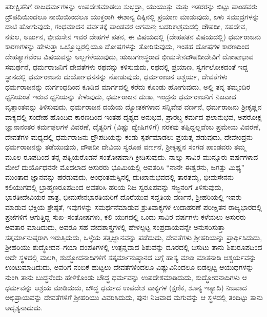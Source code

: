 ಪರೀಕ್ಷಿತನಿಗೆ ರಾಜಧರ್ಮಗಳನ್ನು ಉಪದೇಶಮಾಡಲು ಸುಭದ್ರಾ, ಯುಯುತ್ಸು ಮತ್ತು ಇತರರನ್ನು ಬಿಟ್ಟು ಪಾಂಡವರು ದ್ರೌಪದಿಯಿಂದಲೂ ನಾಯಿಯಿಂದಲೂ ಯುಕ್ತರಾಗಿ ಈಶಾನ್ಯ ದಿಕ್ಕಿನಲ್ಲಿ ಪ್ರಯಾಣ ಮಾಡುವುದು, ಏಳು ಸಮುದ್ರಗಳನ್ನು ದಾಟಿ ಹೋಗುವುದು, ಗಂಧಮಾದನ ಪರ್ವತಕ್ಕೆ ಪಾಂಡವರ ಆಗಮನ; ಬದರಿಕಾಶ್ರಮದಲ್ಲಿ ದೌಪದೀ, ಸಹದೇವ, ನಕುಲ, ಅರ್ಜುನ, ಭೀಮಸೇನ ಇವರ ದೇಹಗಳ ಪತನ, ಈ ವಿಷಯದಲ್ಲಿ (ದೇಹಪತನ ವಿಷಯದಲ್ಲಿ) ಧರ್ಮರಾಜನು ಕಾರಣಗಳನ್ನು ಹೇಳುತ್ತಾ ಒಬ್ಬೊಬ್ಬರಲ್ಲಿಯೂ ದೋಷಗಳನ್ನು ತೋರಿಸುವುದು, ಇಂತಹ ದೋಷಗಳ ಕಾರಣದಿಂದ ದೇಹತ್ಯಾಗವೆಂಬ ವಿಷಯವನ್ನು ಅಲ್ಲಗಳೆಯುವುದು, ಋಜುಗಣಸ್ಥರಾದ ಭೀಮಸೇನದೌಪದೀದೇವಿಗೆ ದೋಷಾಭಾವ ಸಮರ್ಥನೆ, ಧರ್ಮರಾಜನಿಗೆ ದೇವತೆಗಳು ರಥವನ್ನು ಕಳಿಸುವುದು, ರಥದಲ್ಲಿ ಪ್ರಯಾಣ, ಸ್ವರ್ಗಲೋಕದಂತೆ ಇದ್ದ ಸ್ಥಾನದಲ್ಲಿ ಧರ್ಮರಾಜನು ದುರ್ಯೋಧನನನ್ನು ನೋಡುವುದು, ಧರ್ಮರಾಜನ ಆಶ್ಚರ್ಯ, ದೇವತೆಗಳು ಧರ್ಮರಾಜನನ್ನು ದುರ್ಗಂಧದಿಂದ ಕೂಡಿದ ಮಾರ್ಗದಲ್ಲಿ ಕರೆದು ಕೊಂಡು ಹೋಗುವುದು, ಅಲ್ಲಿ ತನ್ನ ತಮ್ಮಂದಿರ ಧ್ವನಿಯಂತೆ ಇರುವ ಧ್ವನಿಯನ್ನು ಕೇಳುವುದು, ಧರ್ಮರಾಜನ ದುಃಖ, ಇಂದ್ರನು ಧರ್ಮರಾಜನಿಗೆ ನಿಜವಾದ ವೃತ್ತಾಂತವನ್ನು ತಿಳಿಸುವುದು, ಧರ್ಮರಾಜನ ದಯೆಯ ದ್ಯೋತಕಗಳಾದ ಸನ್ನಿವೇಶ ವರ್ಣನೆ, ಧರ್ಮರಾಜನು ಶ‍್ರೀಕೃಷ್ಣನ ವಾಕ್ಯದಲ್ಲಿ ಸಂದೇಹ ಹೊಂದಿದ ಕಾರಣದಿಂದ ಇಂತಹ ದೃಶ್ಯದ ಅನುಭವ, ಪ್ರಾರಬ್ಧ ಕರ್ಮದ ಫಲಾನುಭವ, ಅಪರೋಕ್ಷ ಜ್ಞಾನಾನಂತರ ಕರ್ಮಫಲಗಳ ವಿವರಣೆ, ದೈತ್ಯರಿಗೆ (ವಿಷ್ಣು ದ್ವೇಷಿಗಳಿಗೆ) ನರಕವು ತಪ್ಪಿದ್ದಲ್ಲವೆಂಬ ಪ್ರಮೇಯ ವಿವರಣೆ, ದೇವತೆಗಳ ಮಧ್ಯದಲ್ಲಿ ಧರ್ಮರಾಜನು ದ್ರೌಪದಿಯನ್ನು ಕಂಡು ಸ್ಪರ್ಶಮಾಡಲು ಪ್ರಯತ್ನ ಪಡುವುದು, ದೇವೇಂದ್ರನು ಧರ್ಮರಾಜನನ್ನು ತಡೆಯುವುದು, ದೌಪದೀ ದೇವಿಯ ಸ್ವರೂಪ ವರ್ಣನೆ, ಶ‍್ರೀಕೃಷ್ಣನ ಸಂಗಡ ಪಾಂಡವರು ತಮ್ಮ ಮೂಲ ರೂಪದಿಂದ ತನ್ನ ಪತ್ನಿಯರೊಡನೆ ಸಂತೋಷವಾಗಿ ಕ್ರೀಡಿಸುವುದು. ನಾಲ್ಕು ಸಾವಿರ ಮುನ್ನೂರು ವರ್ಷಗಳಾದ ಮೇಲೆ ದುರ್ಯೊಧನನೇ ಮೊದಲಾದ ಅಸುರರು ಭೂಮಿಯಲ್ಲಿ ಅವತರಿಸಿ “ನಾನೇ ಈಶ್ವರನು, ಜಗತ್ತು ಮಿಥ್ಯ” ಮುಂತಾದ ಜ್ಞಾನವನ್ನು ಹರಡುವುದು, ಅಂಧಂತಮಸ್ಸಿನಲ್ಲಿ ದುಃಖಾನುಭವದಲ್ಲಿ ತಾರತಮ್ಯ, ಭೀಮಸೇನನು ಕಲಿಯುಗದಲ್ಲಿ ಬ್ರಾಹ್ಮಣರೂಪದಿಂದ ಅವತರಿಸಿ ಹರಿಯ ನಿಜ ಸ್ವರೂಪವನ್ನು ಸಜ್ಜನರಿಗೆ ತಿಳಿಸುವುದು, ಭಾರತೀದೇವಿಯರ ಪಾತ್ರ, ಭೀಮಸೇನಭಾರತಿಯರಿಗೆ ದೊರೆಯುವ ಸದ್ದತಿಯ ವರ್ಣನೆ, ಶ‍್ರೀಹರಿಯಲ್ಲಿ ಇವರು ಮಾಡುವ ಭಕ್ತಿಯ ಶ್ರೇಷ್ಠತೆ, ಇವುಗಳನ್ನು ಸಮರ್ಥನೆಮಾಡುವ ಶ್ರುತಿವಾಕ್ಯಗಳ ಉದಾಹರಣೆ ಪರೀಕ್ಷಿತನ ರಾಜ್ಯಭಾರದಲ್ಲಿ ಪ್ರಜೆಗಳಿಗೆ ಆಗುತ್ತಿದ್ದ ಸುಖ–ಸಂತೋಷಗಳು, ಕಲಿ ಯುಗದಲ್ಲಿ ಒಂದು ಸಾವಿರ ವರ್ಷಗಳು ಕಳೆಯಲು ಅಸುರರು ಅವತಾರ ಮಾಡಿದುದು, ಅವರೂ ಸಹ ವೇದಶಾಸ್ತ್ರಗಳಲ್ಲಿ ಹೇಳಲ್ಪಟ್ಟ ಸಂಪ್ರದಾಯವನ್ನೇ ಅನುಸರಿಸುತ್ತಾ ಸತ್ಕರ್ಮಾನುಷ್ಠರಾಗಿ ಇರುತ್ತಿದುದು, ಒಳ್ಳೆಯ ತತ್ವಜ್ಞಾನವನ್ನು ಪಡೆದುದು, ದೇವತೆಗಳು ಶ‍್ರೀಹರಿಯನ್ನು ಪ್ರಾರ್ಥಿಸಿದುದು, ಶ‍್ರೀಹರಿಯು ಶುದ್ಧೋದನ–ಗಯಾ ದಂಪತಿಗಳಲ್ಲಿ ಉತ್ಪನ್ನವಾದ ಶಿಶುವನ್ನು ದೂರದಲ್ಲಿ ಬಿಸುಟು ತಾನು ಶಿಶುರೂಪದಿಂದ ಅದೇ ಸ್ಥಳದಲ್ಲಿ ಮಲಗಿ, ಶುದ್ಧೋದನಾದಿಗಳಿಗೆ ಸತ್ಕರ್ಮಾನುಷ್ಠಾನದ ಬಗ್ಗೆ ಹಾಸ್ಯ ಮಾಡಿ ಮಾತನಾಡಿ ಆಶ್ಚರ್ಯವನ್ನು ಉಂಟುಮಾಡಿದುದು, ಅವರಿಗೆ ನಂಬಿಕೆ ಹುಟ್ಟಲು ದೇವತೆಗಳಿಂದಲೂ ವಿಷ್ಣುವಿನಿಂದಲೂ ಬಿಡಲ್ಪಟ್ಟ ಆಯುಧಗಳನ್ನು ನುಂಗಿ ತಾನು ಬುದ್ಧನೆಂದು ಹೇಳಿಕೊಂಡು ಬೌದ್ಧ ಧರ್ಮವನ್ನು ಉಪದೇಶಮಾಡಿದುದು, ಶುದ್ಧೋದನಾದಿಗಳು ಆ ಧರ್ಮವನ್ನು ಆಶ್ರಯ ಮಾಡಿದುದು, ಬೌದ್ಧ ಧರ್ಮದ ಉಪದೇಶ ವಾಕ್ಯಗಳ (ಕ್ಷಣಿಕ, ಶೂನ್ಯ ಇತ್ಯಾದಿ) ನಿಜವಾದ ಅಭಿಪ್ರಾಯವನ್ನು ದೇವತೆಗಳಿಗೆ ಶ‍್ರೀಹರಿಯು ವಿವರಿಸಿದುದು, ಪುನಃ ನಿಜವಾದ ಮಗುವನ್ನು ಆ ಸ್ಥಳದಲ್ಲಿ ತಂದಿಟ್ಟು ತಾನು ಅದೃಶ್ಯನಾದುದು.

